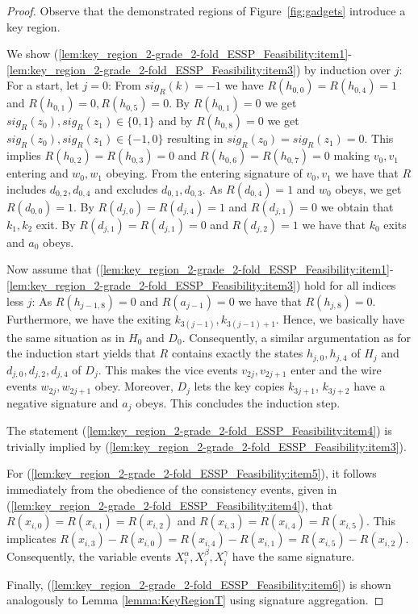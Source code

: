 \documentclass[english]{lipics_hacked}
\begin{document}
\begin{proof}
Observe that the demonstrated regions of Figure~\ref{fig:gadgets} introduce a key region.

We show (\ref{lem:key_region_2-grade_2-fold_ESSP_Feasibility:item1}-\ref{lem:key_region_2-grade_2-fold_ESSP_Feasibility:item3}) by induction over $j$: 
For a start, let $j = 0$:
From $sig_R(k)=-1$ we have $R(h_{0,0})=R(h_{0,4})=1$ and $R(h_{0,1})=0, R(h_{0,5})=0$.
By $R(h_{0,1})=0$ we get $sig_R(z_0), sig_R(z_1)\in \{ 0,1\}$ and by $R(h_{0,8})=0$ we get $sig_R(z_0), sig_R(z_1)\in \{ -1,0\}$ resulting in $sig_R(z_0)=sig_R(z_1)=0$.
This implies $R(h_{0,2})=R(h_{0,3})=0$ and $R(h_{0,6})=R(h_{0,7})=0$ making $v_0,v_1$ entering and $w_0,w_1$ obeying.
From the entering signature of $v_0,v_1$ we have that $R$ includes $d_{0,2},d_{0,4}$ and excludes $d_{0,1},d_{0,3}$. 
As $R(d_{0,4})=1$ and $w_0$ obeys, we get $R(d_{0,0})=1$.
By $R(d_{j,0})=R(d_{j,4})=1$ and $R(d_{j,1})=0$ we obtain that $k_1,k_2$ exit.
By $R(d_{j,1})=R(d_{j,1})=0$ and $R(d_{j,2})=1$ we have that $k_0$ exits and $a_0$ obeys.

Now assume that (\ref{lem:key_region_2-grade_2-fold_ESSP_Feasibility:item1}-\ref{lem:key_region_2-grade_2-fold_ESSP_Feasibility:item3}) hold for all indices less $j$:
As $R(h_{j-1,8})=0$ and $R(a_{j-1})=0$ we have that $R(h_{j,8})=0$.
Furthermore, we have the exiting $k_{3(j-1)}, k_{3(j-1)+1}$.
Hence, we basically have the same situation as in $H_0$ and $D_0$.
Consequently, a similar argumentation as for the induction start yields that $R$ contains exactly the states $h_{j,0}, h_{j,4}$ of $H_j$ and $d_{j,0}, d_{j,2}, d_{j,4}$ of $D_j$.
This makes the vice events $v_{2j}, v_{2j+1}$ enter and the wire events $w_{2j}, w_{2j+1}$ obey.
Moreover, $D_j$ lets the key copies $k_{3j+1}$, $k_{3j+2}$ have a negative signature and $a_j$ obeys.
This concludes the induction step.

The statement (\ref{lem:key_region_2-grade_2-fold_ESSP_Feasibility:item4}) is trivially implied by (\ref{lem:key_region_2-grade_2-fold_ESSP_Feasibility:item3}).

For (\ref{lem:key_region_2-grade_2-fold_ESSP_Feasibility:item5}), it follows immediately from the obedience of the consistency events, given in (\ref{lem:key_region_2-grade_2-fold_ESSP_Feasibility:item4}), that $R(x_{i,0})=R(x_{i,1})=R(x_{i,2})$ and $R(x_{i,3})=R(x_{i,4})=R(x_{i,5})$.
This implicates $R(x_{i,3})-R(x_{i,0})=R(x_{i,4})-R(x_{i,1})=R(x_{i,5})-R(x_{i,2})$.
Consequently, the variable events $X^\alpha_i,X^\beta_i,X^\gamma_i$ have the same signature.

Finally, (\ref{lem:key_region_2-grade_2-fold_ESSP_Feasibility:item6}) is shown analogously to Lemma \ref{lemma:KeyRegionT} using signature aggregation.
\end{proof}
\end{document}
